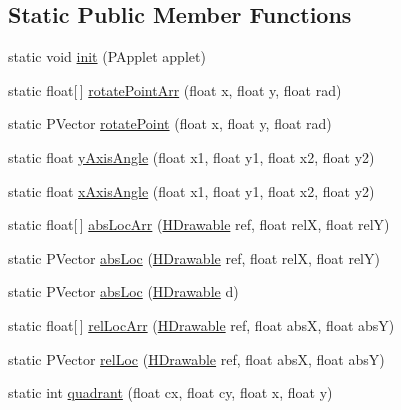 \subsection*{Static Public Member Functions}
\begin{DoxyCompactItemize}
\item 
static void \hyperlink{classhype_1_1util_1_1_h_math_a10a2fda33ced69b93f0ac7045cffd734}{init} (P\-Applet applet)
\item 
static float\mbox{[}$\,$\mbox{]} \hyperlink{classhype_1_1util_1_1_h_math_ae8023e98d4523ae08d796cf9f62191f2}{rotate\-Point\-Arr} (float x, float y, float rad)
\item 
static P\-Vector \hyperlink{classhype_1_1util_1_1_h_math_aa4e1bf088df604f61f7bf8a621cb8e99}{rotate\-Point} (float x, float y, float rad)
\item 
static float \hyperlink{classhype_1_1util_1_1_h_math_a363476101dfefce8fb96f4de6a19ec16}{y\-Axis\-Angle} (float x1, float y1, float x2, float y2)
\item 
static float \hyperlink{classhype_1_1util_1_1_h_math_a89e891d8dfbd6e884a753405a8b13d26}{x\-Axis\-Angle} (float x1, float y1, float x2, float y2)
\item 
static float\mbox{[}$\,$\mbox{]} \hyperlink{classhype_1_1util_1_1_h_math_a7d6bd8eafa0274325c68b60472b0999c}{abs\-Loc\-Arr} (\hyperlink{classhype_1_1drawable_1_1_h_drawable}{H\-Drawable} ref, float rel\-X, float rel\-Y)
\item 
static P\-Vector \hyperlink{classhype_1_1util_1_1_h_math_a572a4aa9b5038abed726c0e6676f3405}{abs\-Loc} (\hyperlink{classhype_1_1drawable_1_1_h_drawable}{H\-Drawable} ref, float rel\-X, float rel\-Y)
\item 
static P\-Vector \hyperlink{classhype_1_1util_1_1_h_math_aee57098084f0f50e331137118f8117de}{abs\-Loc} (\hyperlink{classhype_1_1drawable_1_1_h_drawable}{H\-Drawable} d)
\item 
static float\mbox{[}$\,$\mbox{]} \hyperlink{classhype_1_1util_1_1_h_math_a6b559893c3fc34d449fb74569d69f102}{rel\-Loc\-Arr} (\hyperlink{classhype_1_1drawable_1_1_h_drawable}{H\-Drawable} ref, float abs\-X, float abs\-Y)
\item 
static P\-Vector \hyperlink{classhype_1_1util_1_1_h_math_aadfd0957687dce7e680a8ffab0677bcf}{rel\-Loc} (\hyperlink{classhype_1_1drawable_1_1_h_drawable}{H\-Drawable} ref, float abs\-X, float abs\-Y)
\item 
static int \hyperlink{classhype_1_1util_1_1_h_math_a12b9d0f3cfec809876d8381dd59f4bfa}{quadrant} (float cx, float cy, float x, float y)

\end{DoxyCompactItemize}
